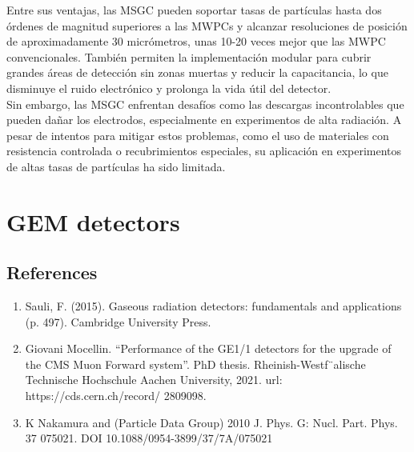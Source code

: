 \documentclass{article}
\begin{document}
\noindent Entre sus ventajas, las MSGC pueden soportar tasas de partículas hasta dos órdenes de magnitud superiores a las MWPCs y alcanzar resoluciones de posición de aproximadamente 30 micrómetros, unas 10-20 veces mejor que las MWPC convencionales. También permiten la implementación modular para cubrir grandes áreas de detección sin zonas muertas y reducir la capacitancia, lo que disminuye el ruido electrónico y prolonga la vida útil del detector.\\

\noindent Sin embargo, las MSGC enfrentan desafíos como las descargas incontrolables que pueden dañar los electrodos, especialmente en experimentos de alta radiación. A pesar de intentos para mitigar estos problemas, como el uso de materiales con resistencia controlada o recubrimientos especiales, su aplicación en experimentos de altas tasas de partículas ha sido limitada.\\


\section{GEM detectors}

\subsection*{References}
\begin{enumerate}
    \item Sauli, F. (2015). Gaseous radiation detectors: fundamentals and applications (p. 497). Cambridge University Press.
    \item Giovani Mocellin. “Performance of the GE1/1 detectors for the upgrade of the
    CMS Muon Forward system”. PhD thesis. Rheinish-Westf¨alische Technische
    Hochschule Aachen University, 2021. url: https://cds.cern.ch/record/
    2809098.
    \item K Nakamura and (Particle Data Group) 2010 J. Phys. G: Nucl. Part. Phys. 37 075021. DOI 10.1088/0954-3899/37/7A/075021
\end{enumerate}



\end{document}
